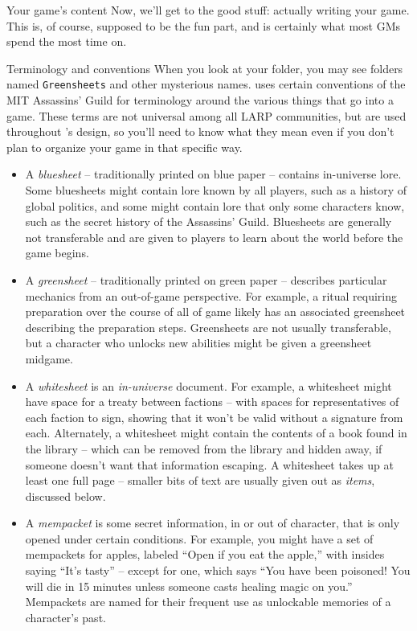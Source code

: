 \documentclass{article}
\begin{document}
\begin{section}{Your game's content}
Now, we'll get to the good stuff: actually writing your game.  This is, of course, supposed to be the fun part, and is certainly what most GMs spend the most time on.

\begin{subsection}{Terminology and conventions}
When you look at your \gametex{} folder, you may see folders named \texttt{Greensheets} and other mysterious names.  \gametex{} uses certain conventions of the MIT Assassins' Guild for terminology around the various things that go into a game.  These terms are not universal among all LARP communities, but are used throughout \gametex{}'s design, so you'll need to know what they mean even if you don't plan to organize your game in that specific way.
\begin{itemize}
    \item A \textit{bluesheet} -- traditionally printed on blue paper -- contains in-universe lore.  Some bluesheets might contain lore known by all players, such as a history of global politics, and some might contain lore that only some characters know, such as the secret history of the Assassins' Guild.  Bluesheets are generally not transferable and are given to players to learn about the world before the game begins.
    \item A \textit{greensheet} -- traditionally printed on green paper -- describes particular mechanics from an out-of-game perspective.  For example, a ritual requiring preparation over the course of all of game likely has an associated greensheet describing the preparation steps.  Greensheets are not usually transferable, but a character who unlocks new abilities might be given a greensheet midgame.
    \item A \textit{whitesheet} is an \emph{in-universe} document.  For example, a whitesheet might have space for a treaty between factions -- with spaces for representatives of each faction to sign, showing that it won't be valid without a signature from each.  Alternately, a whitesheet might contain the contents of a book found in the library -- which can be removed from the library and hidden away, if someone doesn't want that information escaping.  A whitesheet takes up at least one full page – smaller bits of text are usually given out as \textit{items}, discussed below.
    \item A \textit{mempacket} is some secret information, in or out of character, that is only opened under certain conditions.  For example, you might have a set of mempackets for apples, labeled ``Open if you eat the apple,'' with insides saying ``It's tasty'' -- except for one, which says ``You have been poisoned!  You will die in 15 minutes unless someone casts healing magic on you.'' Mempackets are named for their frequent use as unlockable memories of a character's past.

\end{itemize}
\end{subsection}
\end{section}
\end{document}
